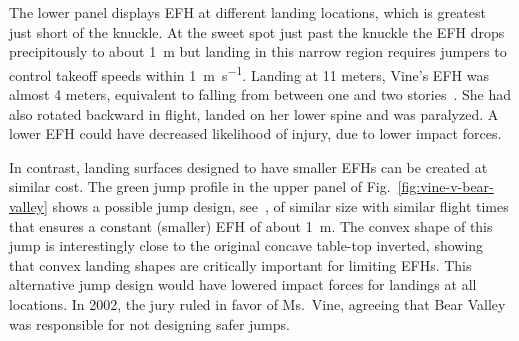 \documentclass[smallextended]{svjour3}       %
\begin{document}
The lower panel displays EFH at different landing locations, which is greatest
just short of the knuckle.  At the sweet spot just past the knuckle the EFH
drops precipitously to  about 1~\si{\meter} but landing in this narrow region
requires jumpers to control takeoff speeds within 1~\si{\meter\per\second}.
Landing at 11 meters, Vine's EFH was almost 4 meters, equivalent to falling
from between one and two stories~\cite{Vish2005}. She had also rotated backward
in flight, landed on her lower spine and was paralyzed. A lower EFH could have
decreased likelihood of injury, due to lower impact forces.

In contrast, landing surfaces designed to have smaller EFHs can be created at
similar cost. The green jump profile in the upper panel of
Fig.~\ref{fig:vine-v-bear-valley} shows a possible jump design,
see~\cite{Levy2015}, of similar size with similar flight times that ensures a
constant (smaller) EFH of about 1~\si{\meter}. The convex shape of this jump is
interestingly close to the original concave table-top  inverted, showing that
convex landing shapes are critically important for limiting EFHs. This
alternative jump design would have lowered impact forces for landings at all
locations. In 2002, the jury ruled in favor of Ms.~Vine, agreeing that Bear
Valley was responsible for not designing safer jumps.
\end{document}
